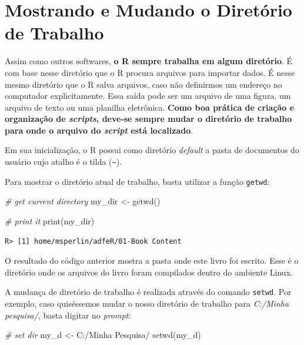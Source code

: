 \documentclass[
  11pt,
]{book}
\newenvironment{Shaded}{\begin{snugshade}}{\end{snugshade}}
\newcommand{\CommentTok}[1]{\textcolor[rgb]{0.37,0.37,0.37}{\textit{#1}}}
\newcommand{\FunctionTok}[1]{\textcolor[rgb]{0,0,0}{#1}}
\newcommand{\NormalTok}[1]{#1}
\newcommand{\OtherTok}[1]{\textcolor[rgb]{0.37,0.37,0.37}{#1}}
\newcommand{\StringTok}[1]{\textcolor[rgb]{0.5,0.5,0.5}{#1}}
\begin{document}
\hypertarget{mostrando-e-mudando-o-diretuxf3rio-de-trabalho}{%
\section{Mostrando e Mudando o Diretório de Trabalho}\label{mostrando-e-mudando-o-diretuxf3rio-de-trabalho}}

Assim como outros softwares, \textbf{o R sempre trabalha em algum diretório}. É com base nesse diretório que o R procura arquivos para importar dados. É nesse mesmo diretório que o R salva arquivos, caso não definirmos um endereço no computador explicitamente. Essa saída pode ser um arquivo de uma figura, um arquivo de texto ou uma planilha eletrônica. \textbf{Como boa prática de criação e organização de \emph{scripts}, deve-se sempre mudar o diretório de trabalho para onde o arquivo do \emph{script} está localizado}.

Em sua inicialização, o R possui como diretório \emph{default} a pasta de documentos do usuário cujo atalho é o tilda (\texttt{\textquotesingle{}\textasciitilde{}\textquotesingle{}}).

Para mostrar o diretório atual de trabalho, basta utilizar a função \texttt{getwd}: 

\begin{Shaded}
\begin{Highlighting}[]
\CommentTok{\# get current directory}
\NormalTok{my\_dir }\OtherTok{\textless{}{-}} \FunctionTok{getwd}\NormalTok{()}

\CommentTok{\# print it}
\FunctionTok{print}\NormalTok{(my\_dir)}
\end{Highlighting}
\end{Shaded}

\begin{verbatim}
R> [1] home/msperlin/adfeR/01-Book Content
\end{verbatim}

O resultado do código anterior mostra a pasta onde este livro foi escrito. Esse é o diretório onde os arquivos do livro foram compilados dentro do ambiente Linux.

A mudança de diretório de trabalho é realizada através do comando \texttt{setwd}. Por exemplo, caso quiséssemos mudar o nosso diretório de trabalho para \emph{C:/Minha pesquisa/}, basta digitar no \emph{prompt}:

\begin{Shaded}
\begin{Highlighting}[]
\CommentTok{\# set dir}
\NormalTok{my\_d }\OtherTok{\textless{}{-}} \StringTok{\textquotesingle{}C:/Minha Pesquisa/\textquotesingle{}}
\FunctionTok{setwd}\NormalTok{(my\_d)}
\end{Highlighting}
\end{Shaded}
\end{document}
